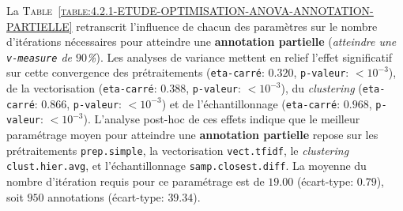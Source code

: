 			La \textsc{Table~\ref{table:4.2.1-ETUDE-OPTIMISATION-ANOVA-ANNOTATION-PARTIELLE}} retranscrit l'influence de chacun des paramètres sur le nombre d'itérations nécessaires pour atteindre une \textbf{annotation partielle} (\textit{atteindre une \texttt{v-measure} de $90$\%}).
			Les analyses de variance mettent en relief l'effet significatif sur cette convergence des prétraitements (\texttt{eta-carré}: $0.320$, \texttt{p-valeur}: $< 10^{-3}$), de la vectorisation (\texttt{eta-carré}: $0.388$, \texttt{p-valeur}: $< 10^{-3}$), du \textit{clustering} (\texttt{eta-carré}: $0.866$, \texttt{p-valeur}: $< 10^{-3}$) et de l'échantillonnage (\texttt{eta-carré}: $0.968$, \texttt{p-valeur}: $< 10^{-3}$).
			L'analyse post-hoc de ces effets indique que le meilleur paramétrage moyen pour atteindre une \textbf{annotation partielle} repose sur les prétraitements \texttt{prep.simple}, la vectorisation \texttt{vect.tfidf}, le \textit{clustering} \texttt{clust.hier.avg}, et l'échantillonnage \texttt{samp.closest.diff}.
			La moyenne du nombre d'itération requis pour ce paramétrage est de $19.00$ (écart-type: $0.79$), soit $950$ annotations (écart-type: $39.34$).
